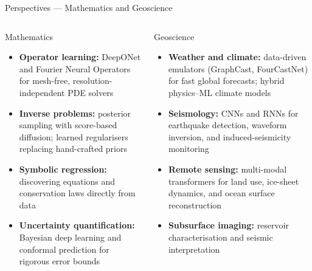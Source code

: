 \documentclass[aspectratio=169,11pt]{beamer}
\begin{document}
\begin{frame}{Perspectives --- Mathematics and Geoscience}
  \begin{columns}[T]
      \begin{block}{Mathematics}
        \begin{itemize}\itemsep2pt
          \item \textbf{Operator learning:}
                DeepONet and Fourier Neural Operators
                for mesh-free, resolution-independent
                PDE solvers
          \item \textbf{Inverse problems:}
                posterior sampling with score-based
                diffusion; learned regularisers
                replacing hand-crafted priors
          \item \textbf{Symbolic regression:}
                discovering equations and conservation
                laws directly from data
          \item \textbf{Uncertainty quantification:}
                Bayesian deep learning and conformal
                prediction for rigorous error bounds
        \end{itemize}
      \end{block}
      \begin{block}{Geoscience}
        \begin{itemize}\itemsep2pt
          \item \textbf{Weather and climate:}
                data-driven emulators (GraphCast,
                FourCastNet) for fast global forecasts;
                hybrid physics--ML climate models
          \item \textbf{Seismology:}
                CNNs and RNNs for earthquake detection,
                waveform inversion, and
                induced-seismicity monitoring
          \item \textbf{Remote sensing:}
                multi-modal transformers for land use,
                ice-sheet dynamics, and
                ocean surface reconstruction
          \item \textbf{Subsurface imaging:}
                reservoir characterisation and seismic
                interpretation
        \end{itemize}
      \end{block}
  \end{columns}
\end{frame}
\end{document}

